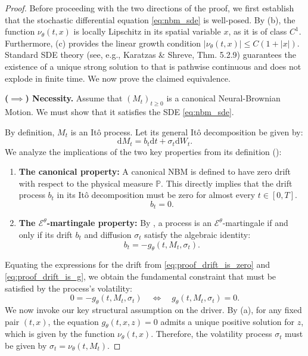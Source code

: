 \documentclass[qian]{imsart}
\newcommand{\Prob}{\mathbb{P}}
\newcommand{\cEneutheta}{\mathcal{E}^{\theta}}
\newcommand{\dd}{\mathrm{d}}
\theoremstyle{plain}
\theoremstyle{definition}
\begin{document}
\begin{proof}
Before proceeding with the two directions of the proof, we first establish that the stochastic differential equation \eqref{eq:nbm_sde} is well-posed. By (b), the function $\nu_\theta(t,x)$ is locally Lipschitz in its spatial variable $x$, as it is of class $C^1$. Furthermore, (c) provides the linear growth condition $|\nu_\theta(t,x)| \le C(1+|x|)$. Standard SDE theory (see, e.g., Karatzas \& Shreve, Thm. 5.2.9) guarantees the existence of a unique strong solution to  that is pathwise continuous and does not explode in finite time. We now prove the claimed equivalence.

\textbf{($\implies$) Necessity.} Assume that $(M_t)_{t \ge 0}$ is a canonical Neural-Brownian Motion. We must show that it satisfies the SDE \eqref{eq:nbm_sde}.

By definition, $M_t$ is an Itô process. Let its general Itô decomposition be given by:
\[ \dd M_t = b_t \dd t + \sigma_t \dd W_t. \]
We analyze the implications of the two key properties from its definition ():

\begin{enumerate}
    \item \textbf{The canonical property:} A canonical NBM is defined to have zero drift with respect to the physical measure $\Prob$. This directly implies that the drift process $b_t$ in its Itô decomposition must be zero for almost every $t \in [0,T]$.
    \begin{equation} \label{eq:proof_drift_is_zero}
        b_t = 0.
    \end{equation}

    \item \textbf{The $\cEneutheta$-martingale property:} By , a process is an $\cEneutheta$-martingale if and only if its drift $b_t$ and diffusion $\sigma_t$ satisfy the algebraic identity:
    \begin{equation} \label{eq:proof_drift_is_g}
        b_t = -g_\theta(t, M_t, \sigma_t).
    \end{equation}
\end{enumerate}

Equating the expressions for the drift from \eqref{eq:proof_drift_is_zero} and \eqref{eq:proof_drift_is_g}, we obtain the fundamental constraint that must be satisfied by the process's volatility:
\[ 0 = -g_\theta(t, M_t, \sigma_t) \quad \iff \quad g_\theta(t, M_t, \sigma_t) = 0. \]
We now invoke our key structural assumption on the driver. By (a), for any fixed pair $(t,x)$, the equation $g_\theta(t,x,z) = 0$ admits a unique positive solution for $z$, which is given by the function $\nu_\theta(t,x)$. Therefore, the volatility process $\sigma_t$ must be given by $\sigma_t = \nu_\theta(t, M_t)$.


\end{proof}
\end{document}
